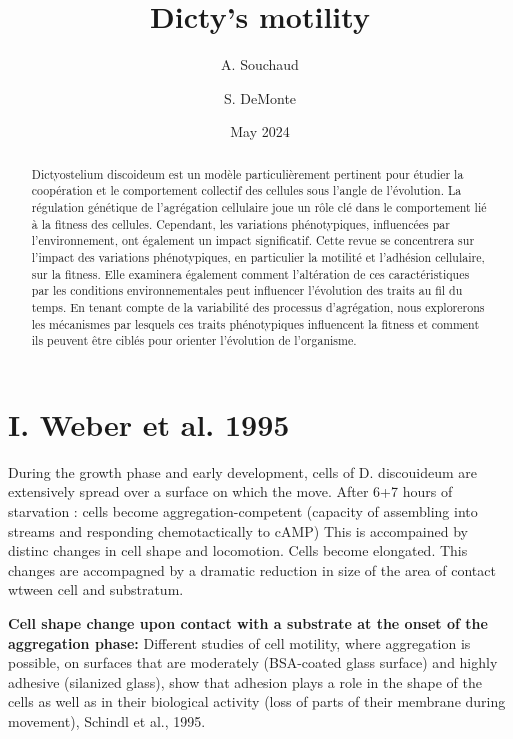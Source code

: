 \documentclass[twocolumn,10pt]{article} %
\title{Dicty's motility}
\author[1]{A. Souchaud}
\author[2]{S. DeMonte}
\affil[1]{\small Institut de Biologie de l'ENS, France}
\affil[2]{\small Allemagne}
\date{May 2024}  %
\begin{document}
\maketitle  %


\begin{abstract}
    Dictyostelium discoideum est un modèle particulièrement pertinent pour étudier la coopération et 
    le comportement collectif des cellules sous l'angle de l'évolution. La régulation génétique de
     l'agrégation cellulaire joue un rôle clé dans le comportement lié à la fitness des cellules.
      Cependant, les variations phénotypiques, influencées par l'environnement, ont également un impact
       significatif. Cette revue se concentrera sur l'impact des variations phénotypiques, en particulier 
       la motilité et l'adhésion cellulaire, sur la fitness. Elle examinera également comment l'altération de ces 
       caractéristiques par les conditions environnementales peut influencer l'évolution des traits au fil du temps. 
       En tenant compte de la variabilité des processus d'agrégation, nous explorerons les mécanismes par lesquels 
       ces traits phénotypiques influencent la fitness et comment ils peuvent être ciblés pour orienter l'évolution 
       de l'organisme.
\end{abstract}

\section{I. Weber et al. 1995}

During the growth phase and early development, cells of D. discouideum are extensively spread over a surface on which the move.
After 6+7 hours of starvation : cells become aggregation-competent (capacity of assembling into streams and responding chemotactically to cAMP)
This is accompained by distinc changes in cell shape and locomotion. Cells become elongated. This changes are accompagned 
by a dramatic reduction in size of the area of contact wtween cell and substratum. \cite{Weber_1995}

\textbf{Cell shape change upon contact with a substrate at the onset of the aggregation phase:}
Different studies of cell motility, where aggregation is possible, on surfaces that are moderately (BSA-coated glass surface) and highly adhesive (silanized glass), show that adhesion plays a role in the shape of the cells as well as in their biological activity (loss of parts of their membrane during movement), Schindl et al., 1995.
\end{document}
